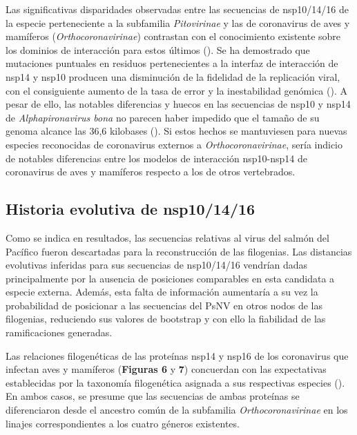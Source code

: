 Las significativas disparidades observadas entre las secuencias de 
nsp10/14/16 de la especie perteneciente a la subfamilia \textit{Pitovirinae}
y las de coronavirus de aves y mamíferos (\textit{Orthocoronavirinae}) 
contrastan con el conocimiento existente sobre los dominios de interacción 
para estos últimos 
(\cite{baddock_characterization_2022,vithani_sars-cov-2_2021}). Se ha 
demostrado que mutaciones puntuales en residuos pertenecientes a la interfaz
de interacción de nsp14 y nsp10 producen una disminución de la fidelidad de 
la replicación viral, con el consiguiente aumento de la tasa de error y la 
inestabilidad genómica 
(\cite{bouvet_rna_2012,chen_biochemical_2011,ogando_curious_2019,rosas-lemus_crystal_2020,takada_genomic_2023}). 
A pesar de ello, las notables diferencias y huecos en las secuencias de 
nsp10 y nsp14 de \textit{Alphapironavirus bona} no parecen haber impedido 
que el tamaño de su genoma alcance las 36,6 kilobases 
(\cite{mordecai_endangered_2019}). Si estos hechos se mantuviesen para 
nuevas especies reconocidas de coronavirus externos a 
\textit{Orthocoronavirinae}, sería indicio de notables diferencias entre los 
modelos de interacción nsp10-nsp14 de coronavirus de aves y mamíferos 
respecto a los de otros vertebrados.

\subsection{Historia evolutiva de nsp10/14/16}

Como se indica en resultados, las secuencias relativas al virus del salmón 
del Pacífico fueron descartadas para la reconstrucción de las filogenias. 
Las distancias evolutivas inferidas para sus secuencias de nsp10/14/16 
vendrían dadas principalmente por la ausencia de posiciones comparables en 
esta candidata a especie externa. Además, esta falta de información 
aumentaría a su vez la probabilidad de posicionar a las secuencias del 
PsNV en otros nodos de las filogenias, reduciendo sus valores de
bootstrap y con ello la fiabilidad de las ramificaciones generadas.

Las relaciones filogenéticas de las proteínas nsp14 y nsp16 de los 
coronavirus que infectan aves y mamíferos (\textbf{Figuras 6} y \textbf{7}) 
concuerdan con las expectativas establecidas por la taxonomía filogenética 
asignada a sus respectivas especies (\cite{gulyaeva_nidovirus_2021,woo_family_2023,zhou_taxonomy_2021}). 
En ambos casos, se presume que las secuencias de ambas proteínas se 
diferenciaron desde el ancestro común de la subfamilia 
\textit{Orthocoronavirinae} en los linajes correspondientes a los cuatro 
géneros existentes.

